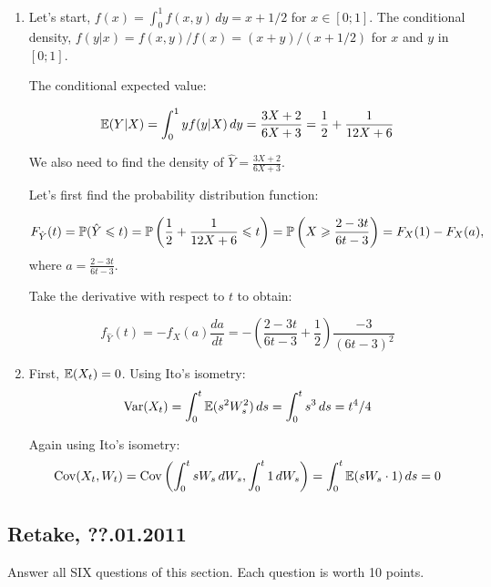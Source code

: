 \documentclass[pdftex,12pt,a4paper]{article}
\begin{document}
\begin{enumerate}
\item Let's start, $f(x)=\int_0^1 f(x,y) \, dy= x+1/2$ for $x\in [0;1]$. The conditional density, $f(y|x)=f(x,y)/f(x)=(x+y)/(x+1/2)$ for $x$ and $y$ in $[0;1]$. 

The conditional expected value:

\[
\E(Y|X)=\int_0^1 y f(y|X) \, dy = \frac{3X+2}{6X+3}=\frac{1}{2}+\frac{1}{12X+6}
\]

We also need to find the density of $\hat{Y}=\frac{3X+2}{6X+3}$.

Let's first find the probability distribution function:

\[
F_{\hat{Y}}(t)=\P(\hat{Y} \leq t) = \P\left( \frac{1}{2}+\frac{1}{12X+6} \leq t \right) = \P\left( X \geq \frac{2-3t}{6t-3} \right)=F_X(1)-F_X(a),
\]
where $a=\frac{2-3t}{6t-3}$. 

Take the derivative with respect to $t$ to obtain:

\[
f_{\hat{Y}}(t)=-f_X(a)\frac{da}{dt}=-\left( \frac{2-3t}{6t-3} + \frac{1}{2}  \right) \frac{-3}{(6t-3)^2} 
\]

\item First, $\E(X_t)=0$. Using Ito's isometry:
\[
\Var(X_t)=\int_0^t  \E(s^2 W_s^2)  \, ds = \int_0^t  s^3  \, ds = t^4/4
\]

Again using Ito's isometry:
\[
\Cov( X_t, W_t) = \Cov \left( \int_0^t sW_s \, dW_s , \int_0^t 1 \, dW_s \right) = \int_0^t \E(sW_s\cdot 1) \, ds = 0
\]

\end{enumerate}


\subsection{Retake, ??.01.2011}

Answer all SIX questions of this section. Each question is worth 10 points.
\end{document}
